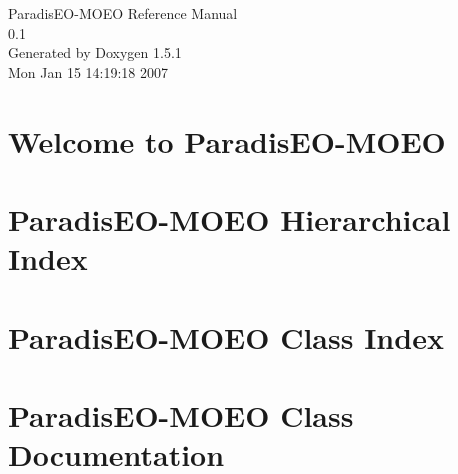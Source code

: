 \documentclass[a4paper]{book}
\begin{document}
\begin{titlepage}
\vspace*{7cm}
\begin{center}
{\Large Paradis\-EO-MOEO Reference Manual\\[1ex]\large 0.1 }\\
\vspace*{1cm}
{\large Generated by Doxygen 1.5.1}\\
\vspace*{0.5cm}
{\small Mon Jan 15 14:19:18 2007}\\
\end{center}
\end{titlepage}
\clearemptydoublepage
{}
\tableofcontents
\clearemptydoublepage
{}
\chapter{Welcome to Paradis\-EO-MOEO }
\label{index}
\chapter{Paradis\-EO-MOEO Hierarchical Index}

\chapter{Paradis\-EO-MOEO Class Index}

\chapter{Paradis\-EO-MOEO Class Documentation}




































\printindex
\end{document}

